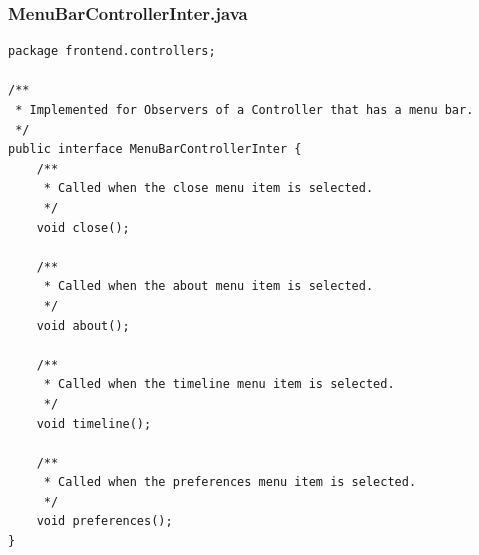 \subsubsection{MenuBarControllerInter.java}
\begin{lstlisting}
package frontend.controllers;

/**
 * Implemented for Observers of a Controller that has a menu bar.
 */
public interface MenuBarControllerInter {
    /**
     * Called when the close menu item is selected.
     */
    void close();

    /**
     * Called when the about menu item is selected.
     */
    void about();

    /**
     * Called when the timeline menu item is selected.
     */
    void timeline();

    /**
     * Called when the preferences menu item is selected.
     */
    void preferences();
}
\end{lstlisting}
